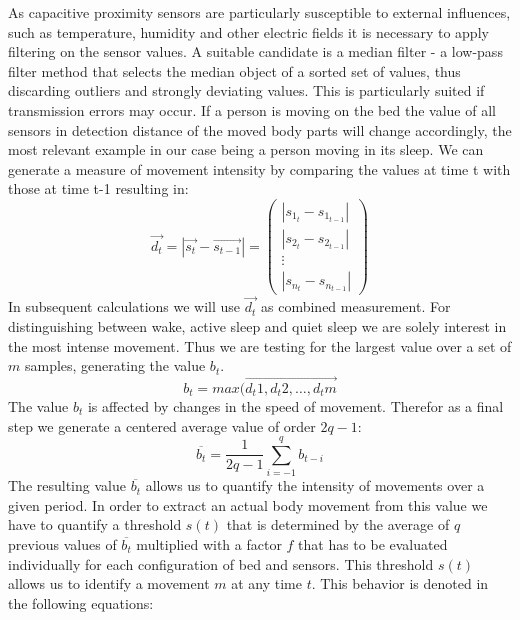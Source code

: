 As capacitive proximity sensors are particularly susceptible to external influences, such as temperature, humidity and other electric fields it is necessary to apply filtering on the sensor values. A suitable candidate is a median filter - a low-pass filter method that selects the median object of a sorted set of values, thus discarding outliers and strongly deviating values. This is particularly suited if transmission errors may occur.
If a person is moving on the bed the value of all sensors in detection distance of the moved body parts will change accordingly, the most relevant example in our case being a person moving in its sleep. We can generate a measure of movement intensity by comparing the values at time t with those at time t-1 resulting in:
\begin{equation}
\overrightarrow{d_t}=\left | \overrightarrow{s_t}-\overrightarrow{s_{t-1}} \right | = \begin{pmatrix}
\left | s_{1_t}-s_{1_{t-1}} \right |\\ 
\left | s_{2_t}-s_{2_{t-1}} \right |\\ 
\vdots \\ 
\left | s_{n_t}-s_{n_{t-1}} \right |
\end{pmatrix}
\end{equation}
In subsequent calculations we will use $\overrightarrow{d_t}$ as combined measurement. For distinguishing between wake, active sleep and quiet sleep we are solely interest in the most intense movement. Thus we are testing for the largest value over a set of $m$ samples, generating the value $b_t$.
\begin{equation}
b_t=max(\overrightarrow{d_t1, d_t2, \hdots, d_tm}
\end{equation}
The value $b_t$ is affected by changes in the speed of movement. Therefor as a final step we generate a centered average value of order $2q-1$:
\begin{equation}
\overline{b_t}=\frac{1}{2q-1}\sum_{i=-1}^q{b_{t-i}}
\end{equation}
The resulting value $\overline{b_t}$ allows us to quantify the intensity of movements over a given period. In order to extract an actual body movement from this value we have to quantify a threshold $s(t)$ that is determined by the average of $q$ previous values of $\overline{b_t}$ multiplied with a factor $f$ that has to be evaluated individually for each configuration of bed and sensors. This threshold $s(t)$ allows us to identify a movement $m$ at any time $t$. This behavior is denoted in the following equations:
